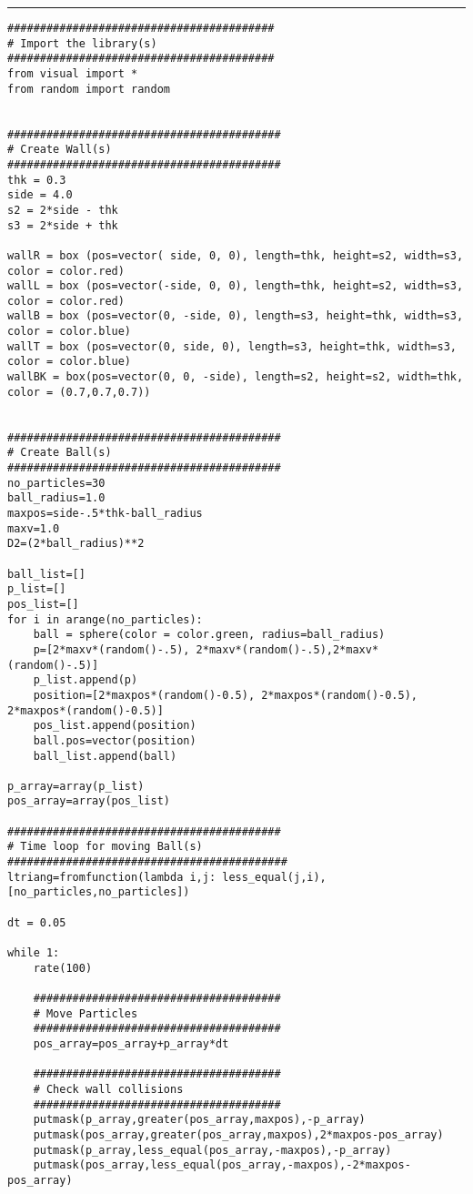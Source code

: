 \documentclass[a4]{article}
\begin{document}
{\color{code}\hrule
\begin{verbatim}
#########################################
# Import the library(s)
#########################################
from visual import *
from random import random


##########################################
# Create Wall(s)
##########################################
thk = 0.3
side = 4.0
s2 = 2*side - thk
s3 = 2*side + thk

wallR = box (pos=vector( side, 0, 0), length=thk, height=s2, width=s3, color = color.red)
wallL = box (pos=vector(-side, 0, 0), length=thk, height=s2, width=s3, color = color.red)
wallB = box (pos=vector(0, -side, 0), length=s3, height=thk, width=s3, color = color.blue)
wallT = box (pos=vector(0, side, 0), length=s3, height=thk, width=s3, color = color.blue)
wallBK = box(pos=vector(0, 0, -side), length=s2, height=s2, width=thk, color = (0.7,0.7,0.7))


##########################################
# Create Ball(s)
##########################################
no_particles=30
ball_radius=1.0
maxpos=side-.5*thk-ball_radius
maxv=1.0
D2=(2*ball_radius)**2

ball_list=[]
p_list=[]
pos_list=[]
for i in arange(no_particles):
    ball = sphere(color = color.green, radius=ball_radius)
    p=[2*maxv*(random()-.5), 2*maxv*(random()-.5),2*maxv*(random()-.5)]
    p_list.append(p)
    position=[2*maxpos*(random()-0.5), 2*maxpos*(random()-0.5), 2*maxpos*(random()-0.5)]
    pos_list.append(position)
    ball.pos=vector(position)
    ball_list.append(ball)

p_array=array(p_list)
pos_array=array(pos_list)

##########################################
# Time loop for moving Ball(s)
###########################################
ltriang=fromfunction(lambda i,j: less_equal(j,i), [no_particles,no_particles])

dt = 0.05

while 1:
    rate(100)

    ######################################
    # Move Particles
    ######################################
    pos_array=pos_array+p_array*dt

    ######################################
    # Check wall collisions
    ######################################
    putmask(p_array,greater(pos_array,maxpos),-p_array)
    putmask(pos_array,greater(pos_array,maxpos),2*maxpos-pos_array)
    putmask(p_array,less_equal(pos_array,-maxpos),-p_array)
    putmask(pos_array,less_equal(pos_array,-maxpos),-2*maxpos-pos_array)


\end{verbatim}}
\end{document}
